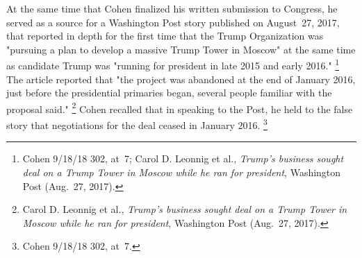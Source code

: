 At the same time that Cohen finalized his written submission to Congress, he served as a source for a Washington Post story published on August~27, 2017, that reported in depth for the first time that the Trump Organization was "pursuing a plan to develop a massive Trump Tower in Moscow" at the same time as candidate Trump was "running for president in late 2015 and early 2016."%
\footnote{Cohen 9/18/18 302, at~7;
Carol D. Leonnig et al., \textit{Trump's business sought deal on a Trump Tower in Moscow while he ran for president}, Washington Post (Aug.~27, 2017).}
The article reported that "the project was abandoned at the end of January 2016, just before the presidential primaries began, several people familiar with the proposal said."%
\footnote{Carol D. Leonnig et al., \textit{Trump's business sought deal on a Trump Tower in Moscow while he ran for president}, Washington Post (Aug.~27, 2017).}
Cohen recalled that in speaking to the Post, he held to the false story that negotiations for the deal ceased in January 2016.%
\footnote{Cohen 9/18/18 302, at~7.}

